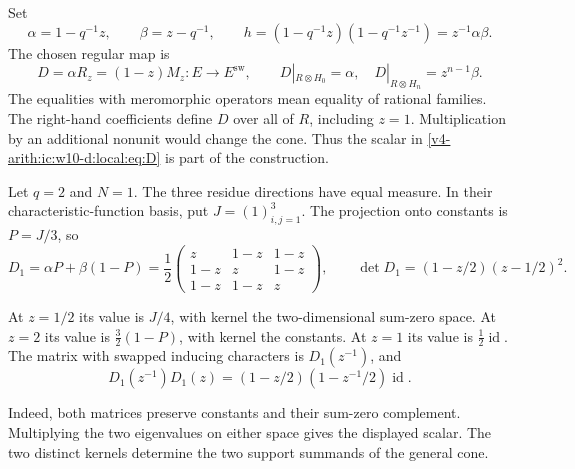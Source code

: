 Set
\[
 \alpha=1-q^{-1}z,\qquad \beta=z-q^{-1},\qquad
 h=(1-q^{-1}z)(1-q^{-1}z^{-1})=z^{-1}\alpha\beta.
\]
The chosen regular map is
\begin{equation}\label{v4-arith:ic:w10-d:local:eq:D}
 D=\alpha R_z=(1-z)M_z:E\longrightarrow E^\mathrm{sw},\qquad
 D|_{R\otimes H_0}=\alpha,\quad
 D|_{R\otimes H_n}=z^{n-1}\beta.
\end{equation}
The equalities with meromorphic operators mean equality of rational families.
The right-hand coefficients define $D$ over all of $R$, including $z=1$.
Multiplication by an additional nonunit would change the cone.
Thus the scalar in \eqref{v4-arith:ic:w10-d:local:eq:D} is part of the construction.

\begin{example}\label{v4-arith:ic:w10-d:local:ex:first}
Let $q=2$ and $N=1$.
The three residue directions have equal measure.
In their characteristic-function basis, put $J=(1)_{i,j=1}^3$.
The projection onto constants is $P=J/3$, so
\[
 D_1=\alpha P+\beta(1-P)
 =\frac12\begin{pmatrix}
 z&1-z&1-z\\1-z&z&1-z\\1-z&1-z&z
 \end{pmatrix},\qquad
 \det D_1=(1-z/2)(z-1/2)^2.
\]

At $z=1/2$ its value is $J/4$, with kernel the two-dimensional sum-zero space.
At $z=2$ its value is $\frac32(1-P)$, with kernel the constants.
At $z=1$ its value is $\frac12\operatorname{id}$.
The matrix with swapped inducing characters is $D_1(z^{-1})$, and
\[
 D_1(z^{-1})D_1(z)=(1-z/2)(1-z^{-1}/2)\operatorname{id}.
\]

Indeed, both matrices preserve constants and their sum-zero complement.
Multiplying the two eigenvalues on either space gives the displayed scalar.
The two distinct kernels determine the two support summands of the general cone.
\end{example}

